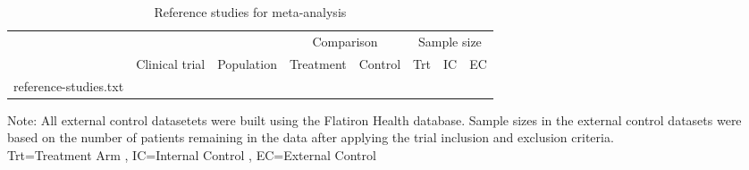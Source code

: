 \documentclass[11pt,final,fleqn]{article}\usepackage[]{graphicx}\usepackage[]{color}
\makeatletter
\newcommand*\ExpandableInput[1]{\@@input#1 }
\makeatother
\begin{document}
\begin{comment}
\begin{table}
\scriptsize
\begin{center}
\begin{threeparttable}
\caption{Reference studies for meta-analysis} \label{tbl:reference-studies_old}
\begin{tabular}{llp{4cm}p{4cm}lll}
\hline
\multicolumn{2}{l}{} & \multicolumn{2}{c}{Comparison} & \multicolumn{3}{c}{Sample size} \\
\cmidrule(r){3-4} \cmidrule(r){5-7}
\multicolumn{1}{l}{} & \multicolumn{1}{l}{Clinical trial} & \multicolumn{1}{l}{Treatment} & \multicolumn{1}{l}{Control} & \multicolumn{1}{l}{Treatment} & \multicolumn{1}{l}{Internal}  & \multicolumn{1}{l}{External} \\
\multicolumn{5}{l}{} & \multicolumn{1}{l}{control} &  \multicolumn{1}{l}{control}\\
\hline
\ExpandableInput{tables/reference-studies-old.txt}
\hline
\end{tabular}
\scriptsize Note: All external control datasetets were built using the Flatiron Health database. Sample sizes in the external control datasets were based on the number of patients remaining in the data after applying the trial inclusion and exclusion criteria.  
\end{threeparttable}
\end{center}
\end{table}
\end{comment}


\begin{table}
\scriptsize
\begin{center}
\begin{threeparttable}
\caption{Reference studies for meta-analysis} \label{tbl:reference-studies}
\begin{tabular}{llp{4cm}p{3cm}p{3cm}rrr}
\hline
\multicolumn{3}{l}{} & \multicolumn{2}{c}{Comparison} & \multicolumn{3}{c}{Sample size} \\
\cmidrule(r){4-5} \cmidrule(r){6-8}
\multicolumn{1}{l}{} & \multicolumn{1}{l}{Clinical trial} & \multicolumn{1}{c}{Population} & 
\multicolumn{1}{c}{Treatment} & \multicolumn{1}{c}{Control} & \multicolumn{1}{c}{Trt} & \multicolumn{1}{c}{IC}  & \multicolumn{1}{c}{EC} \\
\hline
\ExpandableInput{reference-studies.txt}
\hline
\end{tabular}
\scriptsize Note: All external control datasetets were built using the Flatiron Health database. Sample sizes in the external control datasets were based on the number of patients remaining in the data after applying the trial inclusion and exclusion criteria.  \\
Trt=Treatment Arm , IC=Internal Control , EC=External Control
\end{threeparttable}
\end{center}
\end{table}
\end{document}
